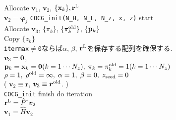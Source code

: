\documentclass[12pt,titlepage]{jarticle}
\renewenvironment{leftbar}{%
  \def\FrameCommand{\vrule width 1pt \hspace{0pt}}%
  \MakeFramed {\advance\hsize-\width \FrameRestore}}%
 {\endMakeFramed}
\begin{document}
\noindent
Allocate ${\boldsymbol v}_1$, ${\boldsymbol v}_2$, $\{{\bf x}_k\}, {\bf r}^{\rm L}$
\\ 
${\boldsymbol v}_2 = {\boldsymbol \varphi_j}$
\vspace{-1em}
\begin{leftbar}
  \noindent
  \verb|COCG_init(N_H, N_L, N_z, x, z)| start
  \\ \hspace{0.5cm}
  Allocate ${\boldsymbol v}_3$, $\{\pi_k\}$, $\{\pi_k^{\rm old}\}$, $\{{\bf p}_k\}$
  \\ \hspace{0.5cm}
  Copy $\{z_k\}$
  \\ \hspace{0.5cm}
  \verb|itermax|$\neq$\verb|0|ならば$\alpha$, $\beta$, ${\bf r}^{\rm L}$を保存する配列を確保する.
  \\ \hspace{0.5cm}
  ${\boldsymbol v}_3 = {\bf 0}$,
  \\ \hspace{0.5cm}
  ${\bf p}_{k} = {\bf x}_k = {\bf 0}(k=1 \cdots N_z),\; \pi_k=\pi_k^{\rm old} = 1(k=1 \cdots N_z)$ 
  \\ \hspace{0.5cm}
  $\rho = 1,\; \rho^{\rm old} = \infty,\; \alpha = 1,\; \beta=0,\; z_{\rm seed}=0$ 
  \\ \hspace{0.5cm}
  (
  ${\boldsymbol v}_2 \equiv {\boldsymbol r}$, 
  ${\boldsymbol v}_3 \equiv {\boldsymbol r}^{\rm old}$. )
  \\
  \verb|COCG_init| finish
\end{leftbar}
\vspace{-1em}
\noindent
do iteration
\\\hspace{0.5cm}
${\bf r}^{\rm L} = {\hat P}^\dagger {\boldsymbol v}_2$
\\\hspace{0.5cm}
${\boldsymbol v}_1 = {\hat H} {\boldsymbol v}_2$
\vspace{-1em}
\end{document}
